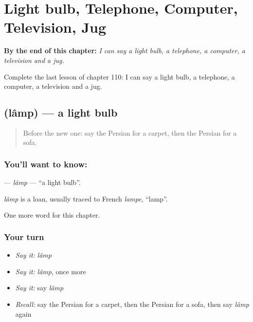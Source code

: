 
\chapter{Light bulb, Telephone, Computer, Television, Jug}
\label{ch:fa-light-bulb-telephone-computer-television-jug}

\begin{chapteropening}
\textbf{By the end of this chapter:} \emph{I can say a light bulb, a telephone, a computer, a television and a jug.}

Complete the last lesson of chapter 110: I can say a light bulb, a telephone, a computer, a television and a jug.
\end{chapteropening}

\section[\texorpdfstring{\fa{لامپ} (lâmp)}{لامپ (lâmp)}]{ (lâmp) — a light bulb}

\label{lesson:FA-C110-lamp}



\begin{quote}
Before the new one: say the Persian for a carpet, then the Persian for a sofa.
\end{quote}

\subsection*{You'll want to know: }
\textbf{} — \emph{lâmp} — \textquotedblleft{}a light bulb\textquotedblright{}.

\begin{cousinweb}
\emph{lâmp} is a loan, usually traced to French \emph{lampe}, \textquotedblleft{}lamp\textquotedblright{}.
\end{cousinweb}

\begin{grammarlens}[title={What you've built}]
One more word for this chapter.
\end{grammarlens}

\subsection*{Your turn}
\begin{itemize}
\raggedright
  \item \emph{Say it:} \emph{lâmp}
  \item \emph{Say it:} \emph{lâmp}, once more
  \item \emph{Say it:} say \emph{lâmp}
  \item \emph{Recall:} say the Persian for a carpet, then the Persian for a sofa, then say \emph{lâmp} again
\end{itemize}

